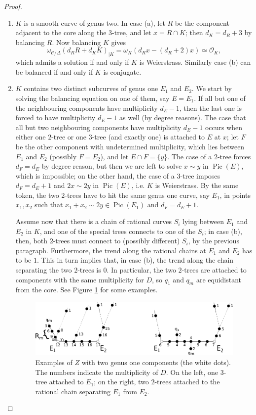 \documentclass[11pt]{amsart}
\newcommand{\OO}{\mathcal O}
\newcommand{\dvr}{\Delta}
\newcommand{\Pic}{\operatorname{Pic}}
\theoremstyle{plain}
\theoremstyle{definition}
\begin{document}
\begin{proof}
\begin{enumerate}[leftmargin=.6cm]

 \item $K$ is a smooth curve of genus two. In case (a), let $R$ be the component adjacent to the core along the $3$-tree, and let $x=R\cap K$; then $d_K=d_R+3$ by balancing $R$. Now balancing $K$ gives \[\omega_{\mathcal C/\dvr}(d_RR+d_KK)_{|K}=\omega_K(d_Rx-(d_R+2)x)\simeq\OO_K,\]
 which admits a solution if and only if $K$ is Weierstrass. Similarly case (b) can be balanced if and only if $K$ is conjugate.
 
 \item\label{E_E} $K$ contains two distinct subcurves of genus one $E_1$ and $E_2$. We start by solving the balancing equation on one of them, say $E=E_1$.
 If all but one of the neighbouring components have multiplicity $d_E-1$, then the last one is forced to have multiplicity $d_E-1$ as well (by degree reasons). The case that all but two neighbouring components have multiplicity $d_E-1$ occurs when either one $2$-tree or one $3$-tree (and exactly one) is attached to $E$ at $x$; let $F$ be the other component with undetermined multiplicity, which lies between $E_1$ and $E_2$ (possibly $F=E_2$), and let $E\cap F=\{y\}$. The case of a $2$-tree forces $d_F=d_E$ by degree reason, but then we are left to solve $x\sim y$ in $\Pic(E)$, which is impossible; on the other hand, the case of a $3$-tree imposes $d_F=d_E+1$ and $2x\sim 2y$ in $\Pic(E)$, i.e. $K$ is Weierstrass. By the same token, the two $2$-trees have to hit the same genus one curve, say $E_1$, in points $x_1,x_2$ such that $x_1+x_2\sim 2y\in\Pic(E_1)$ and $d_F=d_E+1$.
 
 Assume now that there is a chain of rational curves $S_i$ lying between $E_1$ and $E_2$ in $K$, and one of the special trees connects to one of the $S_i$; in case (b), then, both $2$-trees must connect to (possibly different) $S_i$, by the previous paragraph. Furthermore, the trend along the rational chains at $E_1$ and $E_2$ has to be $1$. This in turn implies that, in case (b), the trend along the chain separating the two $2$-trees is $0$. In particular, the two $2$-trees are attached to components with the same multiplicity for $D$, so $q_1$ and $q_m$ are equidistant from the core. See Figure \ref{fig:E1E2} for some examples.
 
 \begin{figure}[h]
 \includegraphics[width=.8\textwidth]{E1E2example} 
 \caption{Examples of $Z$ with two genus one components (the white dots). The numbers indicate the multiplicity of $D$. On the left, one $3$-tree attached to $E_1$; on the right, two $2$-trees attached to the rational chain separating $E_1$ from $E_2$.}\label{fig:E1E2}
  \end{figure}
  

\end{enumerate}
\end{proof}
\end{document}
